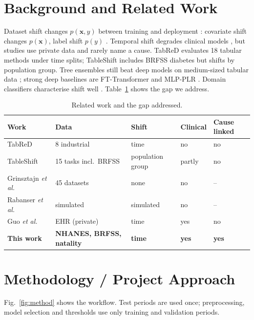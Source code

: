 \documentclass[journal,twoside,web]{ieeecolor}
\begin{document}
\section{Background and Related Work}
\label{sec:related}
Dataset shift changes $p(\mathbf{x},y)$ between training and deployment \cite{moreno2012unifying}:
covariate shift changes $p(\mathbf{x})$, label shift $p(y)$ \cite{lipton2018detecting}. Temporal
shift degrades clinical models \cite{davis2017calibration,guo2022evaluation}, but studies use
private data and rarely name a cause. TabReD \cite{rubachev2025tabred,tabredrepo} evaluates 18
tabular methods under time splits; TableShift \cite{gardner2023tableshift} includes BRFSS diabetes
but shifts by population group. Tree ensembles still beat deep models on medium-sized tabular data
\cite{grinsztajn2022why}; strong deep baselines are FT-Transformer \cite{gorishniy2021revisiting}
and MLP-PLR \cite{gorishniy2022embeddings}. Domain classifiers characterise shift well
\cite{rabanser2019failing}. Table~\ref{tab:related} shows the gap we address.

\begin{table}[!t]
\caption{Related work and the gap addressed.}
\label{tab:related}
\centering
\setlength{\tabcolsep}{3pt}
\begin{tabular}{@{}p{2.05cm}p{1.6cm}p{1.35cm}p{1.1cm}p{1.1cm}@{}}
\toprule
Work & Data & Shift & Clinical & Cause linked \\
\midrule
TabReD \cite{rubachev2025tabred} & 8 industrial & time & no & no \\
TableShift \cite{gardner2023tableshift} & 15 tasks incl.\ BRFSS & population group & partly & no \\
Grinsztajn \emph{et al.} \cite{grinsztajn2022why} & 45 datasets & none & no & -- \\
Rabanser \emph{et al.} \cite{rabanser2019failing} & simulated & simulated & no & -- \\
Guo \emph{et al.} \cite{guo2022evaluation} & EHR (private) & time & yes & no \\
\midrule
\textbf{This work} & \textbf{NHANES, BRFSS, natality} & \textbf{time} & \textbf{yes} & \textbf{yes} \\
\bottomrule
\end{tabular}
\end{table}

\section{Methodology / Project Approach}
\label{sec:method}
Fig.~\ref{fig:method} shows the workflow. Test periods are used once; preprocessing, model
selection and thresholds use only training and validation periods.
\end{document}
